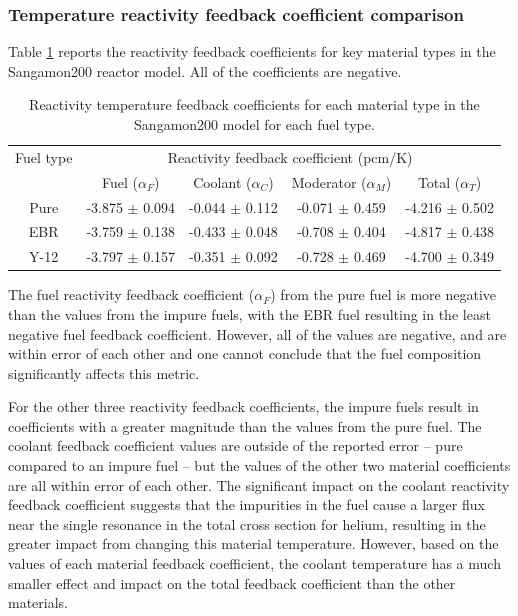 \subsubsection{Temperature reactivity feedback coefficient comparison}
Table \ref{tab:coeff_xe100} reports the reactivity feedback 
coefficients for key material types in the Sangamon200 reactor model. 
All of the coefficients are negative.

\begin{table}[h!]
        \centering
        \caption{Reactivity temperature feedback coefficients for 
        each material type in the Sangamon200 model for each fuel 
        type.}
        \label{tab:coeff_xe100}
        \begin{tabular}{c c c c c}
            \hline 
            Fuel type & \multicolumn{4}{c}{Reactivity feedback coefficient (pcm/K)} \\
            & Fuel ($\alpha_F$) & Coolant ($\alpha_C$) & Moderator ($\alpha_M$) & Total ($\alpha_T$)\\
            \hline
            Pure & -3.875 $\pm$ 0.094 & -0.044 $\pm$ 0.112 & -0.071 $\pm$ 0.459 & -4.216 $\pm$ 0.502\\
            \gls*{EBR} & -3.759 $\pm$ 0.138 & -0.433 $\pm$ 0.048 & -0.708 $\pm$ 0.404 & -4.817 $\pm$ 0.438\\
            Y-12 & -3.797 $\pm$ 0.157 & -0.351 $\pm$ 0.092 & -0.728 $\pm$ 0.469 & -4.700 $\pm$ 0.349\\
            \hline

        \end{tabular}
\end{table}

The fuel reactivity feedback coefficient 
($\alpha_F$) from the pure fuel is more 
negative than the values from the impure fuels, with the \gls*{EBR} fuel 
resulting in the least negative fuel feedback coefficient. However, all of 
the values are negative, and are within error of each other and 
one cannot conclude that the fuel composition significantly affects this 
metric. 

For the other three reactivity feedback coefficients, the impure fuels 
result in coefficients with a greater magnitude than the values from 
the pure fuel. The coolant feedback coefficient values are outside 
of the reported error -- pure compared to an impure fuel -- but the 
values of the other two material coefficients are all within error of 
each other. The significant impact on the coolant reactivity feedback 
coefficient suggests that the impurities in the fuel cause a larger 
flux near the single resonance in the total cross section for helium,
resulting in the greater impact from changing this material temperature. 
However, based on the values of each material feedback coefficient, 
the coolant temperature has a much smaller effect and impact on the 
total feedback coefficient than the other materials. 


